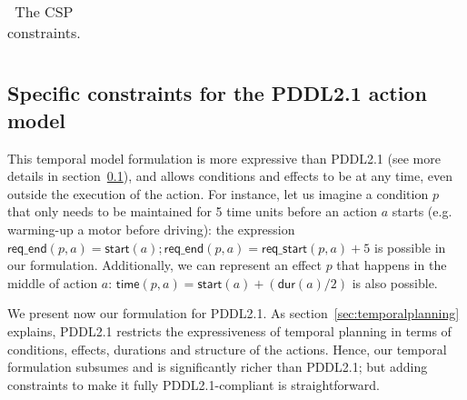 \documentclass{ecai}
\newcommand{\dur}{\mathsf{dur}}    %
\newcommand{\start}{\mathsf{start}}%
\newcommand{\tim}{\mathsf{time}}   %
\newcommand{\reqs}{\mathsf{req\_{start}}} %
\newcommand{\reqe}{\mathsf{req\_{end}}}   %
\begin{document}
\begin{table}
\begin{scriptsize}
\begin{tabular}{ll}
\end{tabular}
\end{scriptsize}
\caption{\small The CSP constraints.}
\label{table:constraints}
\end{table}



\subsection{Specific constraints for the PDDL2.1 action model}
\label{sec:PDDL21constraints}
This temporal model formulation is more expressive than PDDL2.1 (see more details in section~\ref{sec:PDDL21constraints}), and allows conditions and effects to be at any time, even outside the execution of the action. For instance, let us imagine a condition $p$ that only needs to be maintained for 5 time units before an action $a$ starts (e.g. warming-up a motor before driving): the expression $\reqe(p,a)=\start(a); \reqe(p,a) = \reqs(p,a)+5$ is possible in our formulation. Additionally, we can represent an effect $p$ that happens in the middle of action $a$: $\tim(p,a) = \start(a)+ (\dur(a) / 2)$ is also possible.

We present now our formulation for PDDL2.1. As section~\ref{sec:temporalplanning} explains, PDDL2.1 restricts the expressiveness of temporal planning in terms of conditions, effects, durations and structure of the actions. Hence, our temporal formulation subsumes and is significantly richer than PDDL2.1; but adding constraints to make it fully PDDL2.1-compliant is straightforward.
\end{document}
